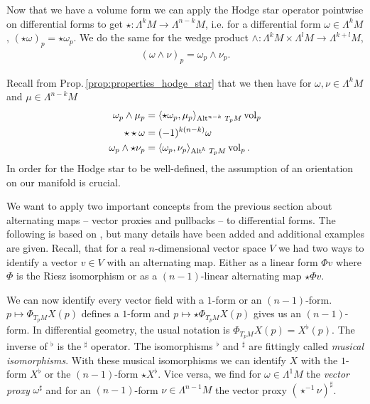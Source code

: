 \documentclass[../master_thesis.tex]{subfiles}
\begin{document}
Now that we have a volume form we can apply the Hodge star operator pointwise on differential forms
to get
$\star: \Lambda^k M \rightarrow \Lambda^{n-k} M$,
i.e. for a differential form $\omega \in \Lambda^k M$, $(\star \omega)_p = \star \omega_p$. 
We do the same for the wedge product
$\wedge: \Lambda^k M \times \Lambda^l M \rightarrow \Lambda^{k+l} M$,
\begin{align*}
    (\omega \wedge \nu )_p = \omega_p \wedge \nu_p. 
\end{align*} 

Recall from Prop.\,\ref{prop:properties_hodge_star} that we then have for $\omega, \nu \in \Lambda^k M$ and 
$\mu \in \Lambda^{n-k} M$
\begin{align*}
    \omega_p \wedge \mu_p &= \langle \star \omega_p, \mu_p \rangle _{{\operatorname{Alt}^{n-k}\,T_p M}} \operatorname{vol}_p
    \\ \star \star \omega &= (-1)^{k(n-k)} \omega
    \\ \omega_p \wedge \star \nu_p &= \langle \omega_p, \nu_p \rangle _{{\operatorname{Alt}^{k}\,T_p M}} \operatorname{vol}_p.
\end{align*}
In order for 
the Hodge star to be well-defined, the assumption of an orientation on our 
manifold is crucial. 

We want to apply two important concepts from the previous section about 
alternating maps -- vector proxies and pullbacks -- to differential forms.
The following is based on \cite[Ch.\,6]{arnold}, 
but many details have been
added and additional examples are given.
Recall, that for a real $n$-dimensional vector space $V$ we had two 
ways to identify a vector $v\in V$ with an alternating map. Either as a 
linear form $\Phi v$ where $\Phi$ is the Riesz isomorphism or as a 
$(n-1)$-linear alternating map $\star \Phi v$. 

We can now identify every vector field with a $1$-form or 
an $(n-1)$-form. $p \mapsto \Phi_{T_p M} X(p)$ defines a $1$-form and  
$p \mapsto \star \Phi_{T_p M} X(p)$ gives us an $(n-1)$-form. In differential 
geometry, the usual notation is
$\Phi_{T_p M} X(p) = X^\flat(p)$. The inverse of $^\flat$ is the $^\sharp$ operator.
The isomorphisms $^\flat$ and $^\sharp$ 
are fittingly called \textit{musical isomorphisms}. 
With these musical isomorphisms we can identify $X$ with the $1$-form 
$X^\flat$ or the $(n-1)$-form $\star X^\flat$. Vice versa, we find 
for $\omega \in \Lambda^1 M$ the \textit{vector proxy} $\omega ^\sharp$ and for 
an $(n-1)$-form $\nu \in \Lambda^{n-1} M$ the vector proxy $(\star^{-1} \nu)^\sharp$.
\end{document}
